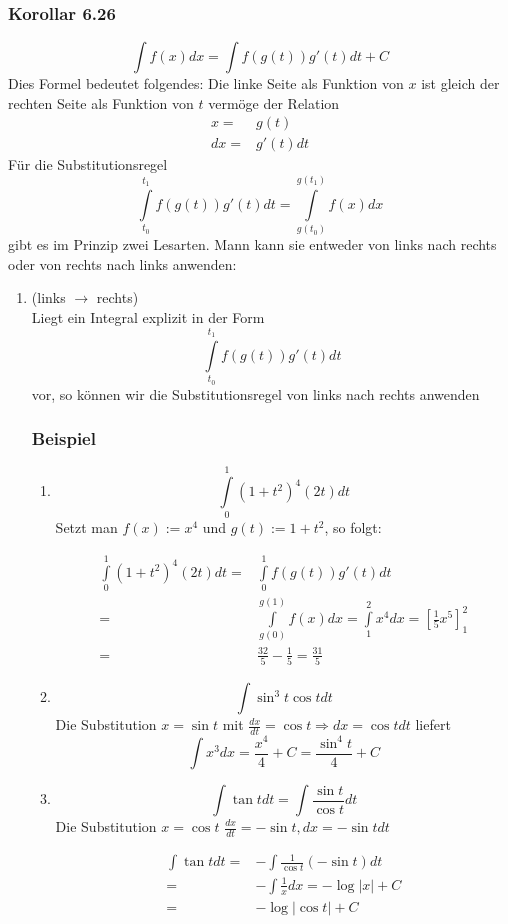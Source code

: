 \subsubsection*{Korollar 6.26}
\[\int {f(x)dx = \int {f\left( {g(t)} \right)} g'(t)dt + C} \]
Dies Formel bedeutet folgendes: Die linke Seite als Funktion von $x$ ist gleich der rechten Seite als Funktion von $t$ vermöge der Relation
\begin{align*}
x=&g(t)\\
dx=&g'(t)dt
\end{align*}
Für die Substitutionsregel
\[\int\limits_{{t_0}}^{{t_1}} {f\left( {g(t)} \right)g'(t)dt = \int\limits_{g({t_0})}^{g({t_1})} {f(x)dx} } \]
gibt es im Prinzip zwei Lesarten.
\noindent Mann kann sie entweder von links nach rechts oder von rechts nach links anwenden:
\begin{enumerate}
\item (links $\to$ rechts)\\
Liegt ein Integral explizit in der Form \[\int\limits_{{t_0}}^{{t_1}} {f\left( {g(t)} \right)g'(t)dt}\] vor, so können wir die Substitutionsregel von links nach rechts anwenden
\subsubsection*{Beispiel}
\begin{enumerate}
\item \[\int\limits_0^1 {{{(1 + {t^2})}^4}(2t)dt} \] Setzt man $f(x):=x^4$ und $g(t):=1+t^2$, so folgt:

\begin{align*}
\int\limits_0^1 {{{(1 + {t^2})}^4}(2t)dt}  =&\int\limits_0^1 {f\left( {g(t)} \right)g'(t)dt} \\
=&\int\limits_{g(0)}^{g(1)} {f(x)dx = } \int\limits_1^2 {{x^4}dx = \left[ {\frac{1}{5}{x^5}} \right]_1^2} \\
=&\frac{{32}}{5} - \frac{1}{5} = \frac{{31}}{5}
\end{align*}

\item \[\int {{{\sin }^3}t\cos t dt} \] Die Substitution $x=\sin t$ mit $\frac{dx}{dt}=\cos t \Rightarrow dx=\cos t dt$ liefert \[\int {{x^3}dx = \frac{{{x^4}}}{4} + C = \frac{{{{\sin }^4}t}}{4}}  + C\]
\item \[\int {\tan tdt = \int {\frac{{\sin t}}{{\cos t}}dt} } \]
Die Substitution $x=\cos t$ $\frac{dx}{dt}=-\sin t, dx=-\sin t dt$

\begin{align*}
\int\tan tdt =&- \int {\frac{1}{{\cos t}}( - \sin t)dt}\\
 = &- \int {\frac{1}{x}}   dx= - \log \left| x \right| + C\\
=& - \log \left| {\cos t} \right| + C
\end{align*}


\end{enumerate}
\end{enumerate}
